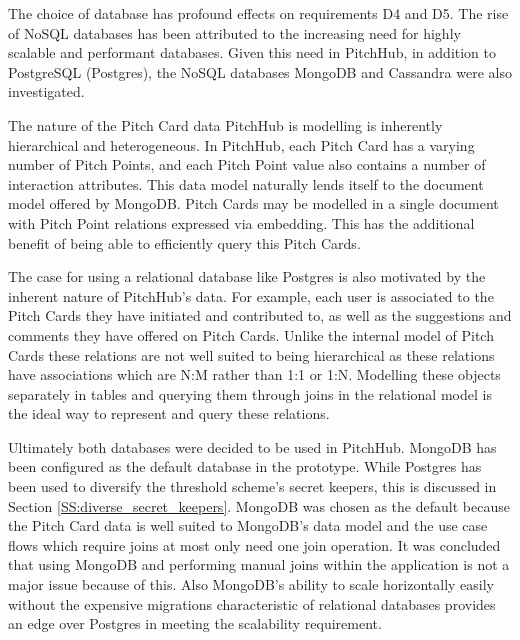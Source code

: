 The choice of database has profound effects on requirements D4 and D5. The rise of NoSQL databases has been attributed to the increasing need for highly scalable and performant databases. Given this need in PitchHub, in addition to PostgreSQL (Postgres), the NoSQL databases MongoDB and Cassandra were also investigated.
\par
The nature of the Pitch Card data PitchHub is modelling is inherently hierarchical and heterogeneous. In PitchHub, each Pitch Card has a varying number of Pitch Points, and each Pitch Point value also contains a number of interaction attributes. This data model naturally lends itself to the document model offered by MongoDB. Pitch Cards may be modelled in a single document with Pitch Point relations expressed via embedding. This has the additional benefit of being able to efficiently query this Pitch Cards.
\par
The case for using a relational database like Postgres is also motivated by the inherent nature of PitchHub's data. For example, each user is associated to the Pitch Cards they have initiated and contributed to, as well as the suggestions and comments they have offered on Pitch Cards. Unlike the internal model of Pitch Cards these relations are not well suited to being hierarchical as these relations have associations which are N:M rather than 1:1 or 1:N. Modelling these objects separately in tables and querying them through joins in the relational model is the ideal way to represent and query these relations.
\par
Ultimately both databases were decided to be used in PitchHub. MongoDB has been configured as the default database in the prototype. While Postgres has been used to diversify the threshold scheme's secret keepers, this is discussed in Section \ref{SS:diverse_secret_keepers}. MongoDB was chosen as the default because the Pitch Card data is well suited to MongoDB's data model and the use case flows which require joins at most only need one join operation. It was concluded that using MongoDB and performing manual joins within the application is not a major issue because of this. Also MongoDB's ability to scale horizontally easily without the expensive migrations characteristic of relational databases provides an edge over Postgres in meeting the scalability requirement.
